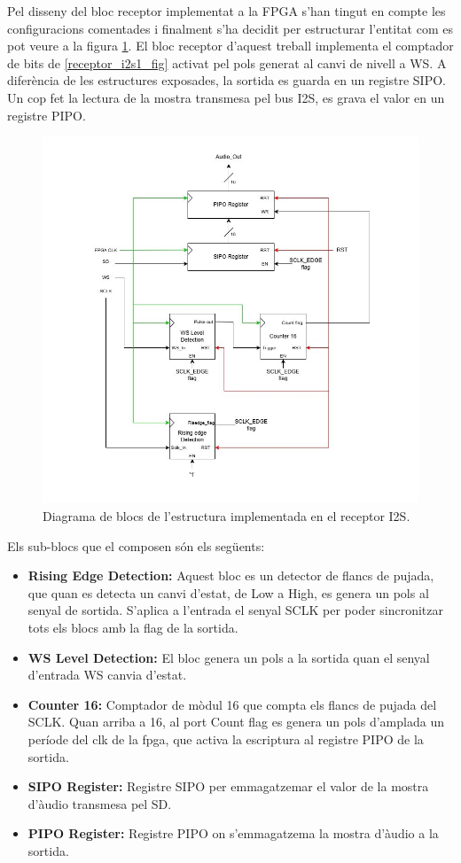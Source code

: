  \par Pel disseny del bloc receptor implementat a la FPGA s'han tingut en compte les configuracions comentades i finalment s'ha decidit per estructurar l'entitat com es pot veure a la figura \ref{diagrama_recI2S_fig}. El bloc receptor d'aquest treball implementa el comptador de bits de \ref{receptor_i2s1_fig} activat pel pols generat al canvi de nivell a WS. A diferència de les estructures exposades, la sortida es guarda en un registre SIPO. Un cop fet la lectura de la mostra transmesa pel bus I2S, es grava el valor en un registre PIPO.
 \begin{figure}[H]
     \centering
     \includegraphics[width=0.55\linewidth]{Images/DiagramaTransceiverI2S.jpg}
     \caption{Diagrama de blocs de l'estructura implementada en el receptor I2S.}
     \label{diagrama_recI2S_fig}
 \end{figure}
 
 Els sub-blocs que el composen són els següents:
 \begin{itemize}
     \item \textbf{Rising Edge Detection:} Aquest bloc es un detector de flancs de pujada, que quan es detecta un canvi d'estat, de Low a High, es genera un pols al senyal de sortida. S'aplica a l'entrada el senyal SCLK per poder sincronitzar tots els blocs amb la flag de la sortida.
     \item \textbf{WS Level Detection:} El bloc genera un pols a la sortida quan el senyal d'entrada WS canvia d'estat. 
     \item \textbf{Counter 16:} Comptador de mòdul 16 que compta els flancs de pujada del SCLK. Quan arriba a 16, al port Count flag es genera un pols d'amplada un període del clk de la fpga, que activa la escriptura al registre PIPO de la sortida.
     \item \textbf{SIPO Register:} Registre SIPO per emmagatzemar el valor de la mostra d'àudio transmesa pel SD.
     \item \textbf{PIPO Register:} Registre PIPO on s'emmagatzema la mostra d'àudio a la sortida.
 \end{itemize}
 
